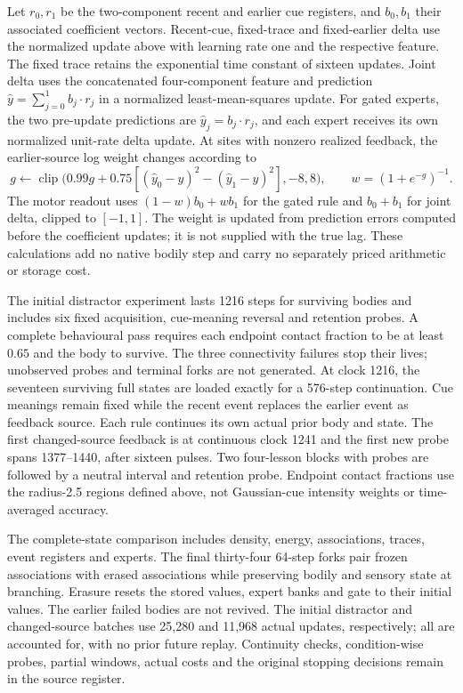 Let $r_0,r_1$ be the two-component recent and earlier cue registers, and $b_0,b_1$ their associated coefficient vectors. Recent-cue, fixed-trace and fixed-earlier delta use the normalized update above with learning rate one and the respective feature. The fixed trace retains the exponential time constant of sixteen updates. Joint delta uses the concatenated four-component feature and prediction $\hat y=\sum_{j=0}^1 b_j\cdot r_j$ in a normalized least-mean-squares update. For gated experts, the two pre-update predictions are $\hat y_j=b_j\cdot r_j$, and each expert receives its own normalized unit-rate delta update. At sites with nonzero realized feedback, the earlier-source log weight changes according to
\begin{equation}
g\leftarrow\operatorname{clip}\bigl(0.99g+0.75[(\hat y_0-y)^2-(\hat y_1-y)^2],-8,8\bigr),
\qquad w=(1+e^{-g})^{-1}.
\end{equation}
The motor readout uses $(1-w)b_0+wb_1$ for the gated rule and $b_0+b_1$ for joint delta, clipped to $[-1,1]$. The weight is updated from prediction errors computed before the coefficient updates; it is not supplied with the true lag. These calculations add no native bodily step and carry no separately priced arithmetic or storage cost.

The initial distractor experiment lasts 1216 steps for surviving bodies and includes six fixed acquisition, cue-meaning reversal and retention probes. A complete behavioural pass requires each endpoint contact fraction to be at least $0.65$ and the body to survive. The three connectivity failures stop their lives; unobserved probes and terminal forks are not generated. At clock 1216, the seventeen surviving full states are loaded exactly for a 576-step continuation. Cue meanings remain fixed while the recent event replaces the earlier event as feedback source. Each rule continues its own actual prior body and state. The first changed-source feedback is at continuous clock 1241 and the first new probe spans 1377--1440, after sixteen pulses. Two four-lesson blocks with probes are followed by a neutral interval and retention probe. Endpoint contact fractions use the radius-2.5 regions defined above, not Gaussian-cue intensity weights or time-averaged accuracy.

The complete-state comparison includes density, energy, associations, traces, event registers and experts. The final thirty-four 64-step forks pair frozen associations with erased associations while preserving bodily and sensory state at branching. Erasure resets the stored values, expert banks and gate to their initial values. The earlier failed bodies are not revived. The initial distractor and changed-source batches use 25,280 and 11,968 actual updates, respectively; all are accounted for, with no prior future replay. Continuity checks, condition-wise probes, partial windows, actual costs and the original stopping decisions remain in the source register.

